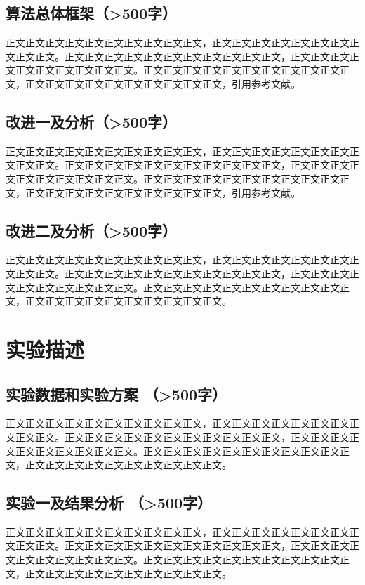 \documentclass{article}
\begin{document}
\subsection{算法总体框架（>500字）}
正文正文正文正文正文正文正文正文正文正文，正文正文正文正文正文正文正文正文正文正文。正文正文正文正文正文正文正文正文正文正文正文，正文正文正文正文正文正文正文正文正文正文。正文正文正文正文正文正文正文正文正文正文正文，正文正文正文正文正文正文正文正文正文正文，引用参考文献\cite{HSV}。


\subsection{改进一及分析（>500字）}
正文正文正文正文正文正文正文正文正文正文，正文正文正文正文正文正文正文正文正文正文。正文正文正文正文正文正文正文正文正文正文正文，正文正文正文正文正文正文正文正文正文正文。正文正文正文正文正文正文正文正文正文正文正文，正文正文正文正文正文正文正文正文正文正文，引用参考文献\cite{ml}。

\subsection{改进二及分析（>500字）}
正文正文正文正文正文正文正文正文正文正文，正文正文正文正文正文正文正文正文正文正文。正文正文正文正文正文正文正文正文正文正文正文，正文正文正文正文正文正文正文正文正文正文。正文正文正文正文正文正文正文正文正文正文正文，正文正文正文正文正文正文正文正文正文正文\cite{imgaug}。


\section{实验描述}
\subsection{实验数据和实验方案 （>500字）}
正文正文正文正文正文正文正文正文正文正文，正文正文正文正文正文正文正文正文正文正文。正文正文正文正文正文正文正文正文正文正文正文，正文正文正文正文正文正文正文正文正文正文。正文正文正文正文正文正文正文正文正文正文正文，正文正文正文正文正文正文正文正文正文正文。

\subsection{实验一及结果分析 （>500字）}
正文正文正文正文正文正文正文正文正文正文，正文正文正文正文正文正文正文正文正文正文。正文正文正文正文正文正文正文正文正文正文正文，正文正文正文正文正文正文正文正文正文正文。正文正文正文正文正文正文正文正文正文正文正文，正文正文正文正文正文正文正文正文正文正文。
\end{document}
